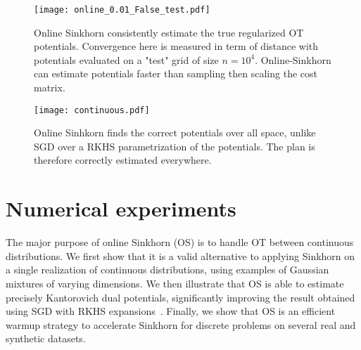 \begin{figure}[t]
    \centering
    \texttt{[image: online\_0.01\_False\_test.pdf]}
    \caption{Online Sinkhorn consistently estimate the true regularized OT potentials. Convergence here is measured in term of distance with potentials evaluated on a "test" grid of size $n=10^4$. Online-Sinkhorn can estimate potentials faster than sampling then scaling the cost matrix.}
    \label{fig:convergence}
\end{figure}

\begin{figure}[t]
    \centering
    \texttt{[image: continuous.pdf]}
    \caption{Online Sinhkorn finds the correct potentials over all space, unlike SGD over a RKHS parametrization of the potentials. The plan is therefore correctly estimated everywhere.}
    \label{fig:potentials}
    \vspace{-1em}
\end{figure}

\section{Numerical experiments}\label{sec:exps}



The major purpose of online Sinkhorn (OS) is to handle OT between continuous
distributions.  We first show that it is a valid alternative to applying Sinkhorn
on a single realization of continuous distributions, using examples of Gaussian mixtures of varying dimensions.
%
We then illustrate that OS is able to estimate precisely
Kantorovich dual potentials, significantly improving the result obtained using SGD with RKHS
expansions~\citep{2016-genevay-nips}.
%
Finally, we show that OS is an efficient warmup strategy to accelerate Sinkhorn for discrete problems on several real and synthetic datasets.


